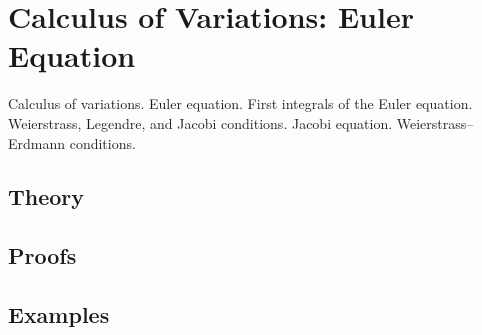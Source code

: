 
\section{Calculus of Variations: Euler Equation}
\label{sec:2.4.09-variational-calculus}

\begin{ticket}
Calculus of variations. Euler equation. First integrals of the Euler equation. Weierstrass, Legendre, and Jacobi conditions. Jacobi equation. Weierstrass–Erdmann conditions.
\end{ticket}

\subsection*{Theory}

\subsection*{Proofs}

\subsection*{Examples}
